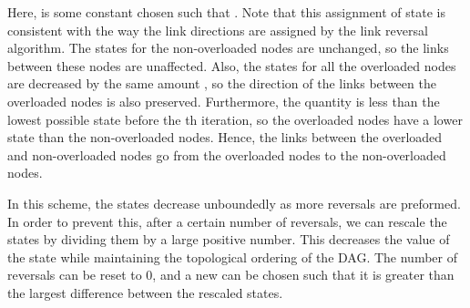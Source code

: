 \documentclass{sig-alternate-2013}
\begin{document}
Here,  is some constant chosen such that . Note that this assignment of state is consistent with the way the link directions are assigned by the link reversal algorithm. The states for the non-overloaded nodes are unchanged, so the links between these nodes are unaffected. Also, the states for all the overloaded nodes are decreased by the same amount , so the direction of the links between the overloaded nodes is also preserved. Furthermore, the quantity  is less than the lowest possible state before the th iteration, so the overloaded nodes have a lower state than the non-overloaded nodes. Hence, the links between the overloaded and non-overloaded nodes go from the overloaded nodes to the non-overloaded nodes. 

In this scheme, the states  decrease unboundedly as more reversals are preformed. In order to prevent this, after a certain number of reversals, we can rescale the states by dividing them by a large positive number. This decreases the value of the state while maintaining the topological ordering of the DAG. The number of reversals  can be reset to 0, and a new  can be chosen such that it is greater than the largest difference between the rescaled states.
\end{document}
